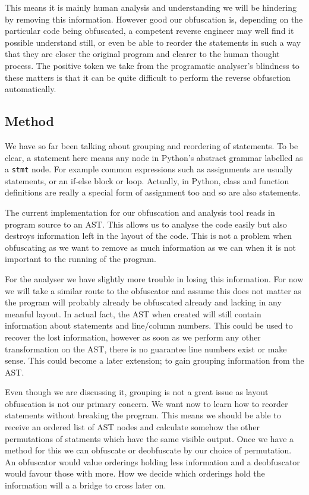 \documentclass{report}
\begin{document}
This means it is mainly human analysis and understanding we will be hindering by removing this information. However good
our obfuscation is, depending on the particular code being obfuscated, a competent reverse engineer may well find it possible
understand still, or even be able to reorder the statements in such a way that they are closer the original program and clearer
to the human thought process. The positive token we take from the programatic analyser's blindness to these matters is that it
can be quite difficult to perform the reverse obfusction automatically.

\subsection{Method}

We have so far been talking about grouping and reordering of statements. To be clear, a statement here means any node in Python's abstract
grammar \cite{pyagrammar} labelled as a \texttt{stmt} node. For example common expressions such as assignments are usually statements, or
an if-else block or loop. Actually, in Python, class and function definitions are really a special form of assignment too and so are also statements.

The current implementation for our obfuscation and analysis tool reads in program source to an AST. This allows us to analyse the code easily
but also destroys information left in the layout of the code. This is not a problem when obfuscating as we want to remove as much information
as we can when it is not important to the running of the program.

For the analyser we have slightly more trouble in losing this information. For now we will take a similar route to the obfuscator and assume this
does not matter as the program will probably already be obfuscated already and lacking in any meanful layout. In actual fact, the AST when created
will still contain information about statements and line/column numbers. This could be used to recover the lost information, however as soon
as we perform any other transformation on the AST, there is no guarantee line numbers exist or make sense. This could become a later extension;
to gain grouping information from the AST.

Even though we are discussing it, grouping is not a great issue as layout obfuscation is not our primary concern. We want now to learn how
to reorder statements without breaking the program. This means we should be able to receive an ordered list of AST nodes and calculate somehow
the other permutations of statments which have the same visible output. Once we have a method for this we can obfuscate or deobfuscate by our choice
of permutation. An obfuscator would value orderings holding less information and a deobfuscator would favour those with more. How we decide which
orderings hold the information will a a bridge to cross later on.
\end{document}
